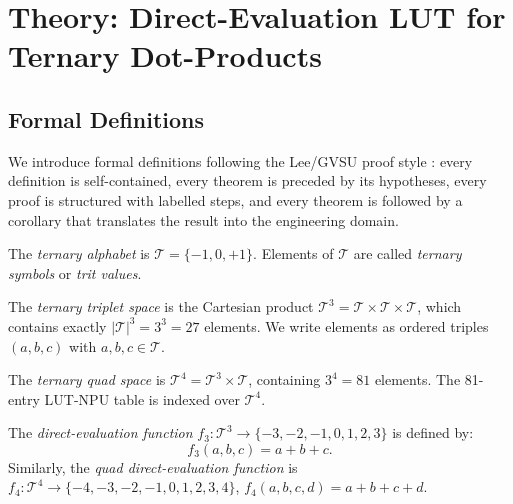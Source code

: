 \section{Theory: Direct-Evaluation LUT for Ternary Dot-Products}
\label{sec:theory}

\subsection{Formal Definitions}

We introduce formal definitions following the Lee/GVSU proof style
\cite{lee_intro_topology}: every definition is self-contained, every theorem
is preceded by its hypotheses, every proof is structured with labelled steps,
and every theorem is followed by a corollary that translates the result into
the engineering domain.

\begin{definition}
\label{def:ternary_alphabet}
The \emph{ternary alphabet} is $\mathcal{T} = \{-1, 0, +1\}$.  Elements
of $\mathcal{T}$ are called \emph{ternary symbols} or \emph{trit values}.
\end{definition}

\begin{definition}
\label{def:triplet_space}
The \emph{ternary triplet space} is the Cartesian product
$\mathcal{T}^3 = \mathcal{T} \times \mathcal{T} \times \mathcal{T}$,
which contains exactly $|\mathcal{T}|^3 = 3^3 = 27$ elements.  We write
elements as ordered triples $(a, b, c)$ with $a, b, c \in \mathcal{T}$.
\end{definition}

\begin{definition}
\label{def:quad_space}
The \emph{ternary quad space} is $\mathcal{T}^4 = \mathcal{T}^3 \times \mathcal{T}$,
containing $3^4 = 81$ elements.  The 81-entry LUT-NPU table is indexed over
$\mathcal{T}^4$.
\end{definition}

\begin{definition}
\label{def:direct_eval}
The \emph{direct-evaluation function} $f_3 : \mathcal{T}^3 \to \{-3,-2,-1,0,1,2,3\}$
is defined by:
\[
  f_3(a, b, c) = a + b + c.
\]
Similarly, the \emph{quad direct-evaluation function} is
$f_4 : \mathcal{T}^4 \to \{-4,-3,-2,-1,0,1,2,3,4\}$,
$f_4(a,b,c,d) = a+b+c+d$.
\end{definition}

